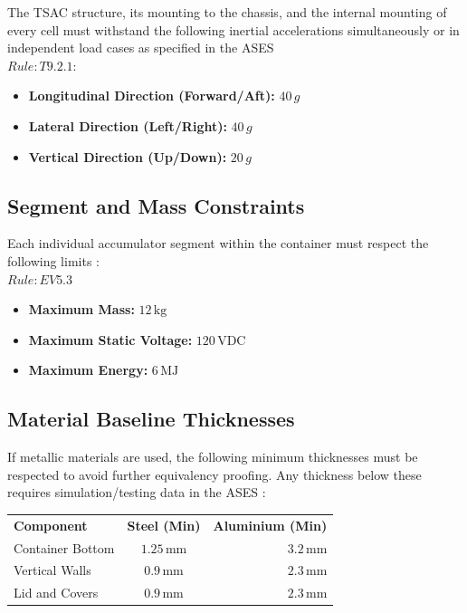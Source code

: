 \documentclass[a4paper,12pt]{article}
\begin{document}


The TSAC structure, its mounting to the chassis, and the internal mounting of every cell must withstand the following inertial accelerations simultaneously or in independent load cases as specified in the ASES \\ $ Rule: T9.2.1 $:
\begin{itemize}
	\item \textbf{Longitudinal Direction (Forward/Aft):} $40\,g$
	\item \textbf{Lateral Direction (Left/Right):} $40\,g$
	\item \textbf{Vertical Direction (Up/Down):} $20\,g$
\end{itemize}

\subsection{Segment and Mass Constraints}
Each individual accumulator segment within the container must respect the following limits :\\
$ Rule: EV5.3 $
\begin{itemize}
	\item \textbf{Maximum Mass:} $12\,\text{kg}$
	\item \textbf{Maximum Static Voltage:} $120\,\text{VDC}$
	\item \textbf{Maximum Energy:} $6\,\text{MJ}$
\end{itemize}

\subsection{Material Baseline Thicknesses}
If metallic materials are used, the following minimum thicknesses must be respected to avoid further equivalency proofing. Any thickness below these requires simulation/testing data in the ASES :


\begin{tabular}{|l|c|r|}

	\textbf{Component} & \textbf{Steel (Min)} & \textbf{Aluminium (Min)} 	\\ 
	Container Bottom   & $1.25\,\text{mm}$    & $3.2\,\text{mm}$        	\\
	Vertical Walls     & $0.9\,\text{mm}$     & $2.3\,\text{mm}$        	\\
	Lid and Covers     & $0.9\,\text{mm}$     & $2.3\,\text{mm}$        	\\ 
	
\end{tabular}
\end{document}
